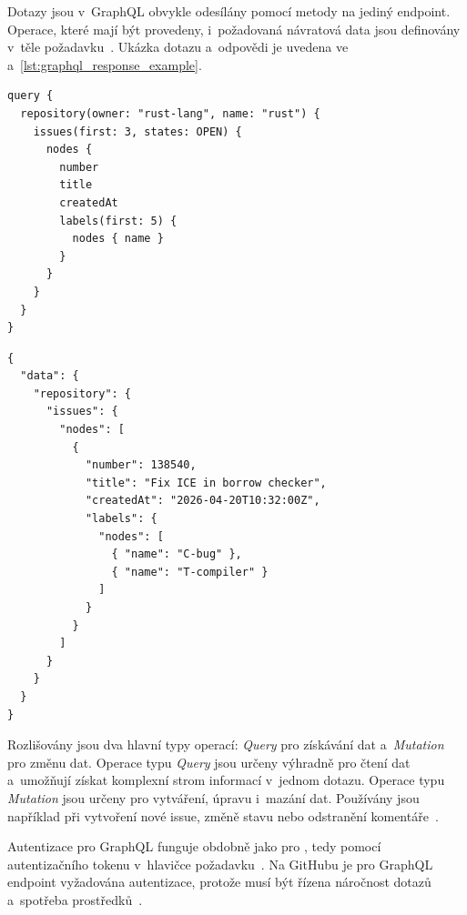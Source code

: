 Dotazy jsou v~GraphQL obvykle odesílány pomocí \HTTP metody  na jediný endpoint. Operace, které mají být provedeny, i~požadovaná návratová data jsou definovány v~těle požadavku~\cite{github_graphql_api}. Ukázka dotazu a~odpovědi je uvedena ve  a~\ref{lst:graphql_response_example}.

\begin{listing}[H]
\begin{verbatim}
query {
  repository(owner: "rust-lang", name: "rust") {
    issues(first: 3, states: OPEN) {
      nodes {
        number
        title
        createdAt
        labels(first: 5) {
          nodes { name }
        }
      }
    }
  }
}
\end{verbatim}
  \caption{Ukázka GraphQL dotazu na otevřené issues repozitáře.}
  \label{lst:graphql_request_example}
\end{listing}

\begin{listing}[H]
\begin{verbatim}
{
  "data": {
    "repository": {
      "issues": {
        "nodes": [
          {
            "number": 138540,
            "title": "Fix ICE in borrow checker",
            "createdAt": "2026-04-20T10:32:00Z",
            "labels": {
              "nodes": [
                { "name": "C-bug" },
                { "name": "T-compiler" }
              ]
            }
          }
        ]
      }
    }
  }
}
\end{verbatim}
  \caption{Zkrácená odpověď na GraphQL dotaz z~.}
  \label{lst:graphql_response_example}
\end{listing}

Rozlišovány jsou dva hlavní typy operací: \textit{Query} pro získávání dat a~\textit{Mutation} pro změnu dat. Operace typu \textit{Query} jsou určeny výhradně pro čtení dat a~umožňují získat komplexní strom informací v~jednom dotazu. Operace typu \textit{Mutation} jsou určeny pro vytváření, úpravu i~mazání dat. Používány jsou například při vytvoření nové issue, změně stavu \PR nebo odstranění komentáře~\cite{github_graphql_api}.

Autentizace pro GraphQL \API funguje obdobně jako pro \REST \API, tedy pomocí autentizačního tokenu v~hlavičce požadavku~\cite{github_graphql_api,github_rest_api}. Na GitHubu je pro GraphQL endpoint vyžadována autentizace, protože musí být řízena náročnost dotazů a~spotřeba prostředků~\cite{github_graphql_api}.
